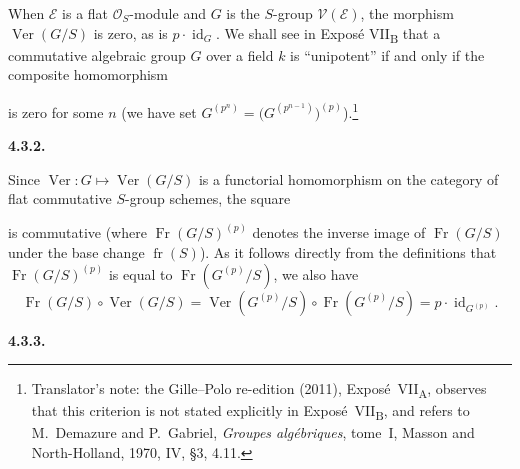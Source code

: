 When \(\mathcal E\) is a flat \(\mathcal O_S\)-module and \(G\) is the
\(S\)-group \(\mathcal V(\mathcal E)\), the morphism
\(\operatorname{Ver}(G/S)\) is zero, as is
\(p\cdot\operatorname{id}_G\). We shall see in Expos\'e
VII\textsubscript{B} that a commutative algebraic group \(G\) over a
field \(k\) is ``unipotent'' if and only if the composite homomorphism
\begin{center}
  \label{sga3:VIIA:4.3.1-iterated-verschiebung-chain}
  
\end{center}
is zero for some \(n\) (we have set
\(G^{(p^n)}=\bigl(G^{(p^{n-1})}\bigr)^{(p)}\)).\footnote{Translator's
note: the Gille--Polo re-edition (2011), Expos\'e~VII\textsubscript{A},
observes that this criterion is not stated explicitly in
Expos\'e~VII\textsubscript{B}, and refers to M.~Demazure and P.~Gabriel,
\textit{Groupes alg\'ebriques}, tome~I, Masson and North-Holland, 1970,
IV, \S3, 4.11.}

\medskip
\noindent\textbf{4.3.2.}
\label{sga3:VIIA:4.3.2}

Since
\(\operatorname{Ver}:G\mapsto\operatorname{Ver}(G/S)\) is a
functorial homomorphism on the category of flat commutative
\(S\)-group schemes, the square
\begin{center}
  \label{sga3:VIIA:4.3.2-frobenius-verschiebung-square}
  
\end{center}
is commutative (where \(\operatorname{Fr}(G/S)^{(p)}\) denotes the
inverse image of \(\operatorname{Fr}(G/S)\) under the base change
\(\operatorname{fr}(S)\)). As it follows directly from the definitions
that \(\operatorname{Fr}(G/S)^{(p)}\) is equal to
\(\operatorname{Fr}(G^{(p)}/S)\), we also have
\[
  \tag{**}\label{sga3:vii:paragraph:4-3-2:equation:double-star}
  \operatorname{Fr}(G/S)\circ\operatorname{Ver}(G/S)
  =
  \operatorname{Ver}(G^{(p)}/S)
    \circ\operatorname{Fr}(G^{(p)}/S)
  =
  p\cdot\operatorname{id}_{G^{(p)}}.
\]

\medskip
\noindent\textbf{4.3.3.}
\label{sga3:VIIA:4.3.3}

